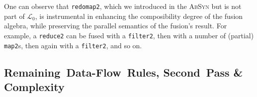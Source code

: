 \documentclass{sigplanconf}  %
\newcommand{\LO}{$\mathcal{L}_0$}
\begin{document}

One can observe that {\tt redomap2}, which we introduced in the \textsc{AbSyn}
but is not part of \LO{}, is instrumental in enhancing the composibility 
degree of the fusion algebra, while preserving the parallel semantics
of the fusion's result. For example, a {\tt reduce2}
can be fused with a {\tt filter2}, then with a number of (partial) {\tt map2}s, 
then again with a {\tt filter2}, and so on. 
  

\subsection{Remaining~Data-Flow~Rules, Second~Pass \& Complexity}
\label{sec:bwdPass}
\end{document}
